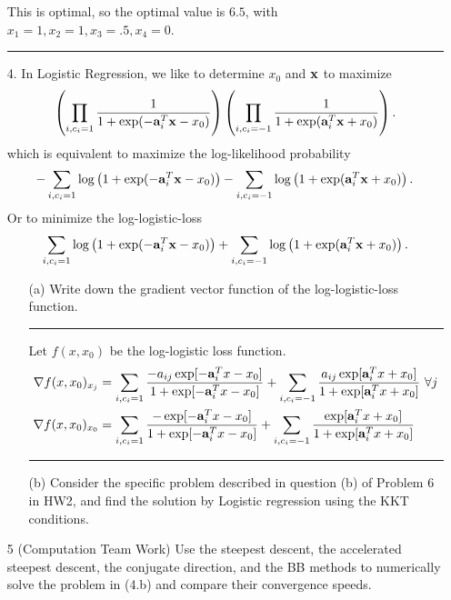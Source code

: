 \documentclass[12pt,letterpaper]{article}
\renewcommand\a{{\bf a}}
\newcommand\x{{\bf x}}
\begin{document}
\begin{enumerate}
This is optimal, so the optimal value is $6.5$, with $x_1 = 1, x_2 = 1, x_3 = .5, x_4 = 0$. 



\rule{\textwidth}{1pt}





\item[4.] In Logistic Regression, we like to determine $x_0$ and $\x$ to maximize
\[
\left(\prod_{i,c_i=1}\frac{1}{1+\exp(-\a_i^T\x-x_0)}\right)
\left(\prod_{i,c_i=-1}\frac{1}{1+\exp(\a_i^T\x+x_0)}\right).
\]
which is equivalent to maximize the log-likelihood probability
\[
-\sum_{i,c_i=1}\log\left(1+\exp(-\a_i^T\x-x_0)\right)-\sum_{i,c_i=-1}\log\left(1+\exp(\a_i^T\x+x_0)\right).
\]
Or to minimize the log-logistic-loss
\[
\sum_{i,c_i=1}\log\left(1+\exp(-\a_i^T\x-x_0)\right)+\sum_{i,c_i=-1}\log\left(1+\exp(\a_i^T\x+x_0)\right).
\]
\begin{enumerate}
\item[(a)] Write down the gradient vector function of the log-logistic-loss function.

\rule{\textwidth}{1pt}

Let $f(x,x_0)$ be the log-logistic loss function. 
\begin{equation*}
\begin{aligned}
\nabla f(x,x_0)_{x_j} &= \sum_{i,c_i = 1} \frac{-a_{ij} \exp[ -\a_i^T x - x_0 ]}{ 1 + \exp[ -\a_i^T x - x_0 ]} + \sum_{i, c_i = -1} \frac{a_{ij} \exp[ \a_i^T x + x_0 ]}{ 1 + \exp[ \a_i^T x + x_0 ]}  \mbox{  } \forall j \\
\nabla f(x,x_0)_{x_0} &= \sum_{i,c_i = 1} \frac{- \exp[ -\a_i^T x - x_0 ]}{ 1 + \exp[ -\a_i^T x - x_0 ]} + \sum_{i, c_i = -1} \frac{ \exp[ \a_i^T x + x_0 ]}{ 1 + \exp[ \a_i^T x + x_0 ]} \\  
\end{aligned}
\end{equation*}


\rule{\textwidth}{1pt}

\item[(b)] Consider the specific problem described in question (b) of Problem 6 in HW2, and find the solution by
Logistic regression using the KKT conditions. 


\end{enumerate}

\item[5] (Computation Team Work) Use the steepest descent, the accelerated steepest descent, the conjugate direction, and the BB methods to numerically solve the problem in (4.b) and compare their convergence speeds.


\end{enumerate}
\end{document}

